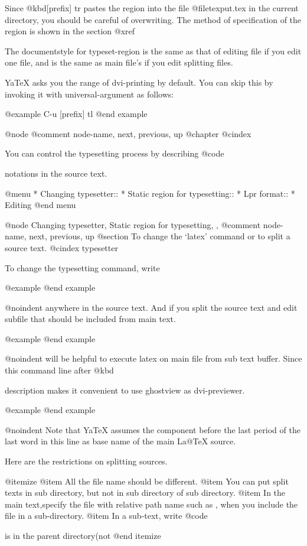   Since @kbd{[prefix] tr} pastes the region into the file
@file{texput.tex} in the current directory, you should be careful of
overwriting.  The method of specification of the region is shown in the
section @xref{%

  The documentstyle  for typeset-region is the same as that of editing
file if you edit one  file,  and is the same as main file's if you
edit splitting files.

  YaTeX asks you the range of dvi-printing by default.  You can
skip this by invoking it with universal-argument as follows:

@example
C-u [prefix] tl
@end example

@node %
@comment  node-name,  next,  previous,  up
@chapter %
@cindex %

  You can control the typesetting process by describing @code{%
notations in the source text.

@menu
* Changing typesetter::         
* Static region for typesetting::  
* Lpr format::                  
* Editing %
@end menu

@node Changing typesetter, Static region for typesetting,  , %
@comment  node-name,  next,  previous,  up
@section To change the `latex' command or to split a source text.
@cindex typesetter

  To change the typesetting command, write

@example
@end example

@noindent
anywhere in the source text.  And if you split the source text and
edit subfile that should be included from main text.

@example
@end example

@noindent
will be helpful to execute latex on main file from sub text buffer.  Since
this command line after @kbd{%
description makes it convenient to use ghostview as dvi-previewer.

@example
@end example

@noindent
Note that YaTeX  assumes the component  before the  last period of
the last word in this line as base name of the main La@TeX{} source.

  Here are the restrictions on splitting sources.

@itemize
@item All the file name should be different.
@item You can put split texts in sub directory, but not in
 sub directory of sub directory.
@item In the main text,specify the file with relative path name
 such as , when you include the file in
 a sub-directory.
@item In a sub-text, write @code{%
 is in the parent directory(not %
@end itemize

}}}}
